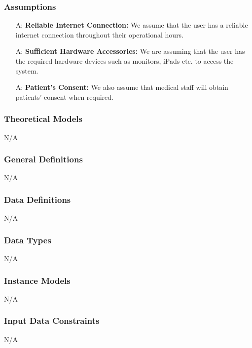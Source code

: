 \documentclass[12pt]{article}
\newcounter{assumpnum} %
\begin{document}
\subsubsection{Assumptions} \label{sec_assumpt}

\begin{itemize}
  \item[A\refstepcounter{assumpnum}\theassumpnum \label{A_reliableInternet}:] \textbf{Reliable Internet Connection:} We assume that the user has a reliable internet connection throughout their operational hours.
  \item[A\refstepcounter{assumpnum}\theassumpnum \label{A_sufficientHardware}:] \textbf{Sufficient Hardware Accessories:} We are assuming that the user has the required hardware devices such as monitors, iPads etc. to access the system.
  \item[A\refstepcounter{assumpnum}\theassumpnum \label{A_patientConsent}:] \textbf{Patient’s Consent:} We also assume that medical staff will obtain patients’ consent when required.  
\end{itemize}


\subsubsection{Theoretical Models}\label{sec_theoretical}
N/A

\subsubsection{General Definitions} \label{sec_GeneralDefinitions}
N/A

\subsubsection{Data Definitions}\label{sec_DataDefinitions} 
N/A

\subsubsection{Data Types}\label{sec_DataTypes}
N/A

\subsubsection{Instance Models} \label{sec_InstanceModels} 
N/A

\subsubsection{Input Data Constraints} \label{sec_InputDataConstraints}
N/A
\end{document}
